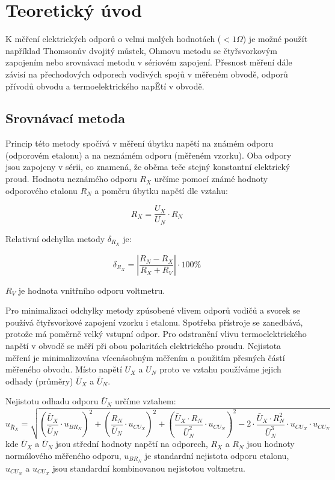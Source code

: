 \documentclass[a4paper, czech]{article}
\begin{document}
\section{Teoretický úvod}

K měření elektrických odporů o velmi malých hodnotách ($<1 \Omega$) je možné použít například Thomsonův dvojitý můstek, Ohmovu metodu se čtyřsvorkovým zapojením nebo srovnávací metodu v sériovém zapojení.
Přesnost měření dále závisí na přechodových odporech vodivých spojů v měřeném obvodě, odporů přívodů obvodu a termoelektrického napĚtí v obvodě.

\subsection{Srovnávací metoda}

Princip této metody spočívá v měření úbytku napětí na známém odporu (odporovém etalonu) a na neznámém odporu (měřeném vzorku).
Oba odpory jsou zapojeny v sérii, co znamená, že oběma teče stejný konstantní elektrický proud.
Hodnotu neznámého odporu $R_X$ určíme pomocí známé hodnoty odporového etalonu $R_N$ a poměru úbytku napětí dle vztahu:

\begin{equation*}
    R_X = \frac{U_X}{U_N} \cdot R_N
\end{equation*}

Relativní odchylka metody $\delta_{R_X}$ je:

\begin{equation*}
    \delta_{R_X} = \left|\frac{R_N - R_X}{R_X + R_V}\right| \cdot 100 \%
\end{equation*}

$R_V$ je hodnota vnitřního odporu voltmetru.

Pro minimalizaci odchylky metody zpúsobené vlivem odporů vodičů a svorek se používá čtyřsvorkové zapojení vzorku i etalonu.
Spotřeba přístroje se zanedbává, protože má poměrně velký vstupní odpor.
Pro odstranění vlivu termoelektrického napětí v obvodě se měří při obou polaritách elektrického proudu.
Nejistota měření je minimalizována vícenásobným měřením a použitím přesných částí měřeného obvodu.
Místo napětí $U_X$ a $U_N$ proto ve vztahu používáme jejich odhady (průměry) $\bar{U}_X$ a $\bar{U}_N$.

Nejistotu odhadu odporu $\bar{U}_N$ určíme vztahem:
\begin{equation*}
    u_{\bar{R}_X} = \sqrt{\left( \frac{\bar{U}_X}{\bar{U}_N} \cdot u_{BR_N} \right)^2 + \left( \frac{R_N}{\bar{U}_N} \cdot u_{CU_X} \right)^2 + \left( \frac{\bar{U}_X \cdot R_N}{\bar{U}_N^2} \cdot u_{CU_N} \right)^2 - 2 \cdot \frac{\bar{U}_X \cdot R_N^2}{\bar{U}_N^3} \cdot u_{CU_X} \cdot u_{CU_N}}
\end{equation*}
kde $\bar{U}_X$ a $\bar{U}_N$ jsou střední hodnoty napětí na odporech, $R_X$ a $R_N$ jsou hodnoty normálového měřeného odporu, $u_{BR_N}$ je standardní nejistota odporu etalonu, $u_{CU_N}$ a $u_{CU_X}$ jsou standardní kombinovanou nejistotou voltmetru.
\end{document}
